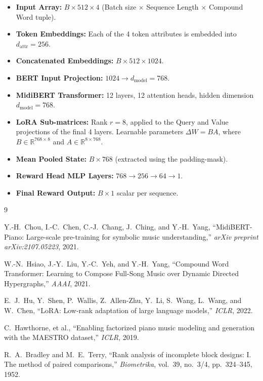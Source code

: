 \documentclass[11pt,a4paper]{article}
\begin{document}
\begin{itemize}
    \item \textbf{Input Array:} $B \times 512 \times 4$ (Batch size $\times$ Sequence Length $\times$ Compound Word tuple).
    \item \textbf{Token Embeddings:} Each of the 4 token attributes is embedded into $d_{\text{attr}} = 256$.
    \item \textbf{Concatenated Embeddings:} $B \times 512 \times 1024$.
    \item \textbf{BERT Input Projection:} $1024 \to d_{\text{model}} = 768$.
    \item \textbf{MidiBERT Transformer:} 12 layers, 12 attention heads, hidden dimension $d_{\text{model}} = 768$.
    \item \textbf{LoRA Sub-matrices:} Rank $r = 8$, applied to the Query and Value projections of the final 4 layers. Learnable parameters $\Delta W = B A$, where $B \in \mathbb{R}^{768 \times 8}$ and $A \in \mathbb{R}^{8 \times 768}$.
    \item \textbf{Mean Pooled State:} $B \times 768$ (extracted using the padding-mask).
    \item \textbf{Reward Head MLP Layers:} $768 \to 256 \to 64 \to 1$.
    \item \textbf{Final Reward Output:} $B \times 1$ scalar per sequence.
\end{itemize}

\begin{thebibliography}{9}

Y.-H.~Chou, I.-C.~Chen, C.-J.~Chang, J.~Ching, and Y.-H.~Yang,
``MidiBERT-Piano: Large-scale pre-training for symbolic music understanding,''
\emph{arXiv preprint arXiv:2107.05223}, 2021.

W.-N.~Hsiao, J.-Y.~Liu, Y.-C.~Yeh, and Y.-H.~Yang,
``Compound Word Transformer: Learning to Compose Full-Song Music over Dynamic Directed Hypergraphs,''
\emph{AAAI}, 2021.

E.~J.~Hu, Y.~Shen, P.~Wallis, Z.~Allen-Zhu, Y.~Li, S.~Wang, L.~Wang, and W.~Chen,
``LoRA: Low-rank adaptation of large language models,''
\emph{ICLR}, 2022.

C.~Hawthorne, et al.,
``Enabling factorized piano music modeling and generation with the MAESTRO dataset,''
\emph{ICLR}, 2019.

R.~A.~Bradley and M.~E.~Terry,
``Rank analysis of incomplete block designs: I. The method of paired comparisons,''
\emph{Biometrika}, vol.~39, no.~3/4, pp.~324--345, 1952.

\end{thebibliography}
\end{document}

